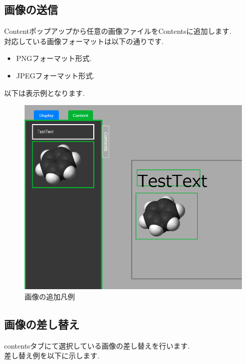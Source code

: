 \documentclass[a4paper,10pt,oneside]{jsbook}
\begin{document}
\newpage





\subsection{画像の送信}
Contentポップアップから任意の画像ファイルをContentsに追加します.\\
対応している画像フォーマットは以下の通りです.\\

\begin{itemize}
\item PNGフォーマット形式.
\item JPEGフォーマット形式.
\end{itemize}

以下は表示例となります.\\
\begin{figure}[htbp]
	\begin{center}
		\includegraphics[width=11.5cm]{image/AddContent_Picture_View.PNG}
	\end{center}
	\caption{画像の追加凡例}
	\label{fig:addimage}
\end{figure}



\newpage

\subsection{画像の差し替え}
contentsタブにて選択している画像の差し替えを行います.\\
差し替え例を以下に示します.\\
\end{document}

